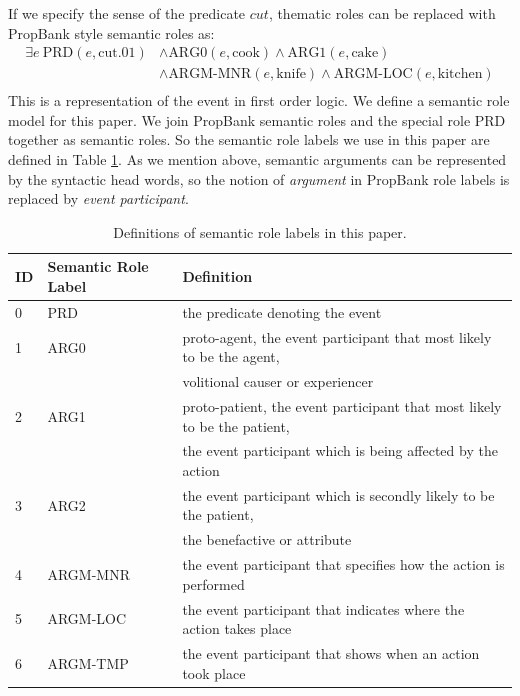 \documentclass[a4paper]{article}
\begin{document}
If we specify the sense of the predicate $cut$, thematic roles can be replaced with PropBank style semantic roles as: 
\begin{equation*} \label{eg:symbolic-semantic}
\begin{aligned}
    \exists e\ \text{PRD}(e, \text{cut.01})
    & \land \text{ARG0}(e, \text{cook}) \land \text{ARG1}(e, \text{cake}) \\
    & \land \text{ARGM-MNR}(e, \text{knife}) \land \text{ARGM-LOC}(e, \text{kitchen}) \\
\end{aligned}
\end{equation*}
This is a representation of the event in first order logic. We define a semantic role model for this paper. We join PropBank semantic roles and the special role PRD together as semantic roles. So the semantic role labels we use in this paper are defined in Table \ref{tab:semantic}. As we mention above, semantic arguments can be represented by the syntactic head words, so the notion of \textit{argument} in PropBank role labels is replaced by \textit{event participant}. 


\begin{table}[t]
\centering
\begin{tabular}{l|l|l} 
\hline
\textbf{ID} &   \textbf{Semantic Role Label}    &   \textbf{Definition} \\  \hline
0           & PRD       &   the predicate denoting the event \\ \hline
1           & ARG0      &   proto-agent, the event participant that most likely to be the agent, \\     &&   volitional causer or experiencer \\ \hline
2           & ARG1      &   proto-patient, the event participant that most likely to be the patient, \\ &&   the event participant which is being affected by the action \\ \hline
3           & ARG2      &   the event participant which is secondly likely to be the patient,  \\       &&   the benefactive or attribute \\ \hline
4           & ARGM-MNR  &   the event participant that specifies how the action is performed \\ \hline
5           & ARGM-LOC  &   the event participant that indicates where the action takes place \\ \hline
6           & ARGM-TMP  &   the event participant that shows when an action took place \\ \hline
\end{tabular}
\caption{\label{tab:semantic} Definitions of semantic role labels in this paper.}
\end{table}
\end{document}
